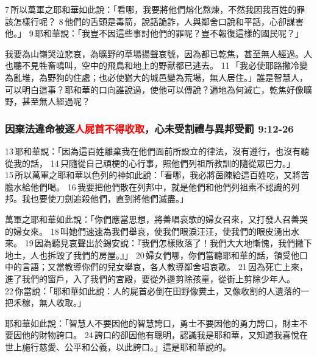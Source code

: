 7 所以萬軍之耶和華如此說：「看哪，我要將他們熔化熬煉，不然我因我百姓的罪該怎樣行呢？ 8 他們的舌頭是毒箭，說話詭詐，人與鄰舍口說和平話，心卻謀害他。」 9 耶和華說：「我豈不因這些事討他們的罪呢？豈不報復這樣的國民呢？」

我要為山嶺哭泣悲哀，為曠野的草場揚聲哀號，因為都已乾焦，甚至無人經過。人也聽不見牲畜鳴叫，空中的飛鳥和地上的野獸都已逃去。 11 「我必使耶路撒冷變為亂堆，為野狗的住處；也必使猶大的城邑變為荒場，無人居住。」誰是智慧人，可以明白這事？耶和華的口向誰說過，使他可以傳說？遍地為何滅亡，乾焦好像曠野，甚至無人經過呢？

\subsubsection{因棄法違命被逐\textcolor{red}{人屍首不得收取}，心未受割禮与異邦受罰 9:12-26}
 13 耶和華說：「因為這百姓離棄我在他們面前所設立的律法，沒有遵行，也沒有聽從我的話， 14 只隨從自己頑梗的心行事，照他們列祖所教訓的隨從眾巴力。」 15 所以萬軍之耶和華以色列的神如此說：「看哪，我必將茵陳給這百姓吃，又將苦膽水給他們喝。 16 我要把他們散在列邦中，就是他們和他們列祖素不認識的列邦。我也要使刀劍追殺他們，直到將他們滅盡。」

萬軍之耶和華如此說：「你們應當思想，將善唱哀歌的婦女召來，又打發人召善哭的婦女來。 18 叫她們速速為我們舉哀，使我們眼淚汪汪，使我們的眼皮湧出水來。 19 因為聽見哀聲出於錫安說：『我們怎樣敗落了！我們大大地慚愧，我們撇下地土，人也拆毀了我們的房屋。』」 20 婦女們哪，你們當聽耶和華的話，領受他口中的言語；又當教導你們的兒女舉哀，各人教導鄰舍唱哀歌。 21 因為死亡上來，進了我們的窗戶，入了我們的宮殿，要從外邊剪除孩童，從街上剪除少年人。 22 你當說：「耶和華如此說：人的屍首必倒在田野像糞土，又像收割的人遺落的一把禾稼，無人收取。」

耶和華如此說：「智慧人不要因他的智慧誇口，勇士不要因他的勇力誇口，財主不要因他的財物誇口。 24 誇口的卻因他有聰明，認識我是耶和華，又知道我喜悅在世上施行慈愛、公平和公義，以此誇口。」這是耶和華說的。

